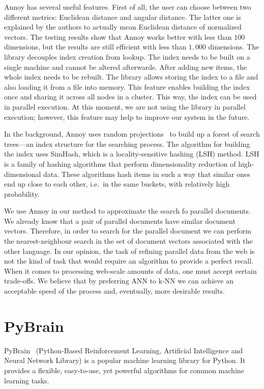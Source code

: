 Annoy has several useful features. First of all, the user can choose between two different metrics: Euclidean distance and angular distance. The latter one is explained by the authors to actually mean Euclidean distance of normalized vectors. The testing results show that Annoy works better with less than $100$ dimensions, but the results are still efficient with less than $1,000$ dimensions. The library decouples index creation from lookup. The index needs to be built on a single machine and cannot be altered afterwards. After adding new items, the whole index needs to be rebuilt. The library allows storing the index to a file and also loading it from a file into memory. This feature enables building the index once and sharing it across all nodes in a cluster. This way, the index can be used in parallel execution. At this moment, we are not using the library in parallel execution; however, this feature may help to improve our system in the future.

In the background, Annoy uses random projections~\cite{Charikar02}\cite{Andoni08} to build up a forest of search trees---an index structure for the searching process. The algorithm for building the index uses SimHash, which is a locality-sensitive hashing (LSH) method. LSH is a family of hashing algorithms that perform dimensionality reduction of high-dimensional data. These algorithms hash items in such a way that similar ones end up close to each other, i.e.\ in the same buckets, with relatively high probability.

We use Annoy in our method to approximate the search fo parallel documents. We already know that a pair of parallel documents have similar document vectors. Therefore, in order to search for the parallel document we can perform the nearest-neighbour search in the set of document vectors associated with the other language. In our opinion, the task of refining parallel data from the web is not the kind of task that would require an algorithm to provide a perfect recall. When it comes to processing web-scale amounts of data, one must accept certain trade-offs. We believe that by preferring ANN to k-NN we can achieve an acceptable speed of the process and, eventually, more desirable results. 

\section{PyBrain}
\label{section:pybrain}

PyBrain~\cite{Schaul10} (Python-Based Reinforcement Learning, Artificial Intelligence and Neural Network Library) is a popular machine learning library for Python. It provides a flexible, easy-to-use, yet powerful algorithms for common machine learning tasks.

